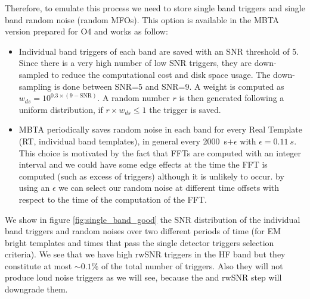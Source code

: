 Therefore, to emulate this process we need to store single band triggers and single band random noise (random MFOs).
This option is available in the MBTA version prepared for O4 and works as follow:
\begin{itemize}
\item Individual band triggers of each band are saved with an SNR threshold of 5.
  Since there is a very high number of low SNR triggers, they are down-sampled to reduce the computational cost and disk space usage.
  The down-sampling is done between SNR=5 and SNR=9.
  A weight is computed as $w_{ds} = 10^{0.3 \times (9-\text{SNR})}$.
  A random number $r$ is then generated following a uniform distribution, if $r \times w_{ds} \leq 1$ the trigger is saved.
\item MBTA periodically saves random noise in each band for every Real Template (RT, individual band templates),  in general every \SI{2000}{s}$ +\epsilon$ with $\epsilon=\SI{0.11}{s}$.
  This choice is motivated by the fact that FFTs are computed with an integer interval and we could have some edge effects at the time the FFT is computed (such as excess of triggers) although it is unlikely to occur.
  by using an $\epsilon$ we can select our random noise at different time offsets with respect to the time of the computation of the FFT.
  
\end{itemize}
We show in figure \ref{fig:single_band_good} the SNR distribution of the individual band triggers and random noises over two different periods of time (for EM bright templates and times that pass the single detector triggers selection criteria).
We see that we have high rwSNR triggers in the HF band but they constitute at most $\sim 0.1\%$ of the total number of triggers.
Also they will not produce loud noise triggers as we will see, because the \achi and rwSNR step will downgrade them.

